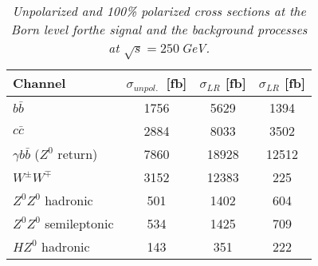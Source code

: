         \begin{table}[H]
        \begin{center}
        \begin{tabular}{l c c c}
        \hline
	Channel & $\sigma_{unpol.}$\ [fb] & $\sigma_{LR}$ [fb] &  $\sigma_{LR}$ [fb] \\
	\hline
	$b\bar{b}$ & 1756 & 5629 & 1394 \\
	\hline
	$c\bar{c}$ & 2884 & 8033 & 3502 \\
	$\gamma b\bar{b}$ ($Z^0$ return) & 7860 & 18928 & 12512 \\
	$W^\pm W^\mp $ &3152&12383&225 \\ 
	$Z^0Z^0$ hadronic &501 & 1402 & 604 \\
	$Z^0Z^0$ semileptonic  &534 & 1425 & 709\\
	$HZ^0$ hadronic  &143 & 351 & 222 \\
        \hline
        \end{tabular}
        \end{center}
        \caption{\sl Unpolarized and 100\% polarized cross sections at the Born level forthe  signal and the background processes at $\sqrt{s}=250$\,GeV. }
        \label{table:bbbarsigma}
        \end{table}
